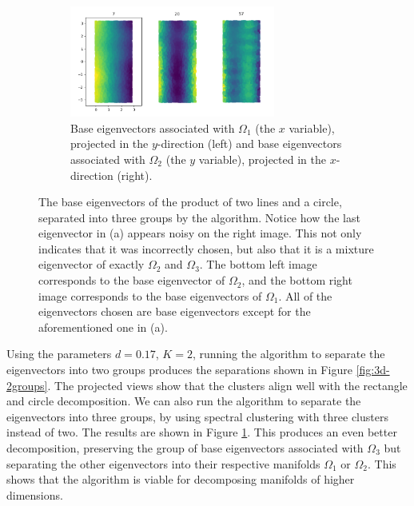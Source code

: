 \documentclass{article}
\numberwithin{equation}{section}
\theoremstyle{definition}
\begin{document}
\begin{figure}
\begin{subfigure}[t]{\textwidth}
        \includegraphics[width=0.74\textwidth]{images/manifold3_rect_circle.png}
        \caption{Base eigenvectors associated with $\Omega_1$ (the $x$ variable), projected in the $y$-direction (left) and base eigenvectors associated with $\Omega_2$ (the $y$ variable), projected in the $x$-direction (right).}
    \end{subfigure}
    \caption{The base eigenvectors of the product of two lines and a circle, separated into three groups by the algorithm. Notice how the last eigenvector in (a) appears noisy on the right image. This not only indicates that it was incorrectly chosen, but also that it is a mixture eigenvector of exactly $\Omega_2$ and $\Omega_3$. The bottom left image corresponds to the base eigenvector of $\Omega_2$, and the bottom right image corresponds to the base eigenvectors of $\Omega_1$. All of the eigenvectors chosen are base eigenvectors except for the aforementioned one in (a).}
    \label{fig:3d-3groups}
\end{figure}

Using the parameters $d = 0.17$, $K = 2$, running the algorithm to separate the eigenvectors into two groups produces the separations shown in Figure \ref{fig:3d-2groups}. The projected views show that the clusters align well with the rectangle and circle decomposition. We can also run the algorithm to separate the eigenvectors into three groups, by using spectral clustering with three clusters instead of two. The results are shown in Figure \ref{fig:3d-3groups}. This produces an even better decomposition, preserving the group of base  eigenvectors associated with $\Omega_3$ but separating the other eigenvectors into their respective manifolds $\Omega_1$ or $\Omega_2$. This shows that the algorithm is viable for decomposing manifolds of higher dimensions.

\clearpage
{}

\end{document}
